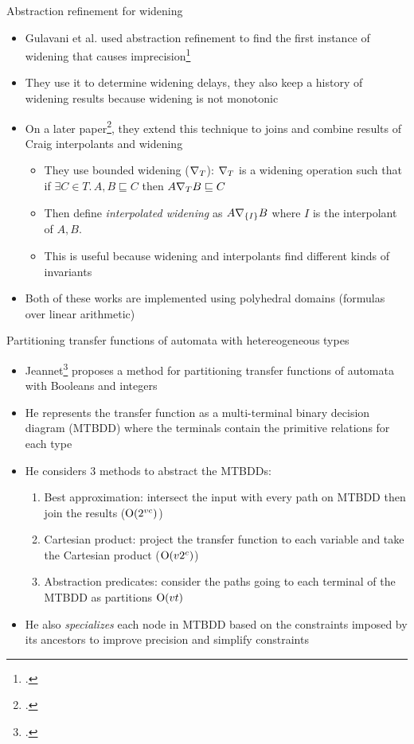 \documentclass[aspectratio=169,notes]{beamer}
\begin{document}
\begin{frame}{Abstraction refinement for widening}
  \small
  \begin{itemize}[<+->]
  \item Gulavani et al. used abstraction refinement to find the first instance of widening that causes imprecision\footcite{gulavani2006counterexample}
  \item They use it to determine widening delays, they also keep a history of widening results because widening is not monotonic
  \item On a later paper\footcite{gulavani2008automatically}, they extend this technique to joins and combine results of Craig interpolants and widening
    \begin{itemize}\footnotesize
    \item They use bounded widening ($\nabla_T$): $\nabla_T$ is a widening operation such that\\ if $\exists C \in T.\, A, B \sqsubseteq C$ then $A \nabla_T B \sqsubseteq C$
    \item Then define \emph{interpolated widening} as $A \nabla_{\left\{I\right\}} B$ where $I$ is the interpolant of $A, B$.
    \item This is useful because widening and interpolants find different kinds of invariants
    \end{itemize}
  \item Both of these works are implemented using polyhedral domains (formulas over linear arithmetic)
  \end{itemize}
\end{frame}

\begin{frame}{Partitioning transfer functions of automata with hetereogeneous types}
  \small
  \begin{itemize}
  \item Jeannet\footcite{jeannet_representing_2002} proposes a method for partitioning transfer functions of automata with Booleans and integers
  \item He represents the transfer function as a multi-terminal binary decision diagram (MTBDD) where the terminals contain the primitive relations for each type
  \item He considers 3 methods to abstract the MTBDDs:
    \begin{enumerate}
    \item Best approximation: intersect the input with every path on MTBDD then join the results ($\operatorname{O}(2^{vc})$)
    \item Cartesian product: project the transfer function to each variable and take the Cartesian product ($\operatorname{O}(v2^{c})$)
    \item Abstraction predicates: consider the paths going to each terminal of the MTBDD as partitions $\operatorname{O}(vt)$
    \end{enumerate}
  \item He also \emph{specializes} each node in MTBDD based on the constraints imposed by its ancestors to improve precision and simplify constraints
  \end{itemize}
\end{frame}
\end{document}
